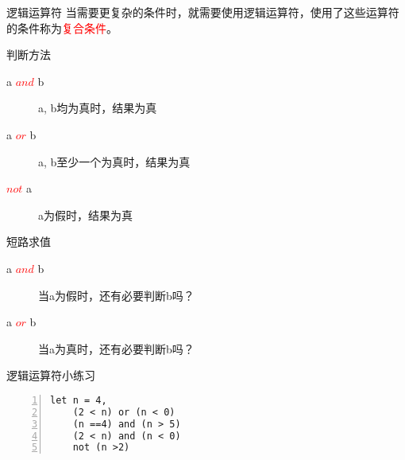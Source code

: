 \documentclass{beamer}
\begin{document}
\begin{frame}[fragile]{逻辑运算符}
当需要更复杂的条件时，就需要使用逻辑运算符，使用了这些运算符的条件称为\textcolor{red}{复合条件}。
\begin{block}{判断方法}
\begin{description}
\item[ a \textcolor{red}{$and$} b ]  a, b均为真时，结果为真
\item[ a \textcolor{red}{$or$} b ]  a, b至少一个为真时，结果为真
\item[ \textcolor{red}{$not$} a ]  a为假时，结果为真
\end{description}
\end{block}
\begin{block}{短路求值}
\begin{description}
\item[ a \textcolor{red}{$and$} b ]  当a为假时，还有必要判断b吗？
\item[ a \textcolor{red}{$or$} b ]  当a为真时，还有必要判断b吗？
\end{description}
\end{block}

\end{frame}

\begin{frame}[fragile]{逻辑运算符小练习}


\begin{block}{}
\begin{Verbatim}[numbers=left,frame=single,rulecolor=\color{red}]
let n = 4,
    (2 < n) or (n < 0)
    (n ==4) and (n > 5)
    (2 < n) and (n < 0)
    not (n >2)
\end{Verbatim}
\end{block}

\end{frame}
\end{document}
